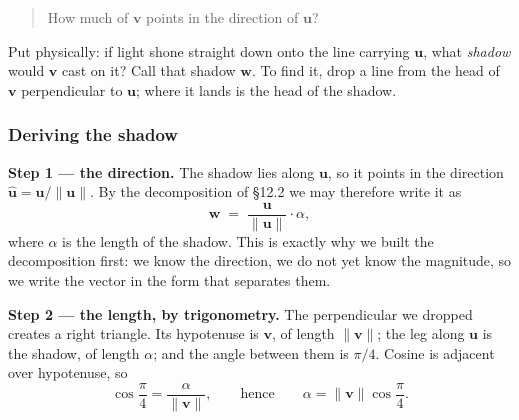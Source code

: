 \documentclass[11pt]{article}
\theoremstyle{definition}
\theoremstyle{remark}
\newcommand{\vc}[1]{\mathbf{#1}}
\newcommand{\norm}[1]{\lVert #1\rVert}
\newcommand{\uv}[1]{\hat{\vc{#1}}}                 %
\newcommand{\lattice}[4]{%
  \draw[step=1cm,gray!25,very thin] (#1,#3) grid (#2,#4);
  \draw[axisline] (#1,0) -- (#2+0.45,0) node[right,font=\scriptsize,black]{$x$};
  \draw[axisline] (0,#3) -- (0,#4+0.45) node[above,font=\scriptsize,black]{$y$};
}
\begin{document}
\begin{quote}
How much of $\vc{v}$ points in the direction of $\vc{u}$?
\end{quote}

\noindent Put physically: if light shone straight down onto the line carrying
$\vc{u}$, what \emph{shadow} would $\vc{v}$ cast on it? Call that shadow
$\vc{w}$. To find it, drop a line from the head of $\vc{v}$ perpendicular to
$\vc{u}$; where it lands is the head of the shadow.

\begin{center}
\end{center}

\subsubsection*{Deriving the shadow}
\textbf{Step 1 --- the direction.} The shadow lies along $\vc{u}$, so it points
in the direction $\uv{u}=\vc{u}/\norm{\vc{u}}$. By the decomposition of \S12.2
we may therefore write it as
\[
  \vc{w} \;=\; \frac{\vc{u}}{\norm{\vc{u}}}\cdot\alpha ,
\]
where $\alpha$ is the length of the shadow. This is exactly why we built the
decomposition first: we know the direction, we do not yet know the magnitude, so
we write the vector in the form that separates them.

\smallskip
\noindent\textbf{Step 2 --- the length, by trigonometry.} The perpendicular we
dropped creates a right triangle. Its hypotenuse is $\vc{v}$, of length
$\norm{\vc{v}}$; the leg along $\vc{u}$ is the shadow, of length $\alpha$; and
the angle between them is $\pi/4$. Cosine is adjacent over hypotenuse, so
\[
  \cos\frac{\pi}{4} = \frac{\alpha}{\norm{\vc{v}}},
  \qquad\text{hence}\qquad
  \alpha = \norm{\vc{v}}\cos\frac{\pi}{4} .
\]
\end{document}
